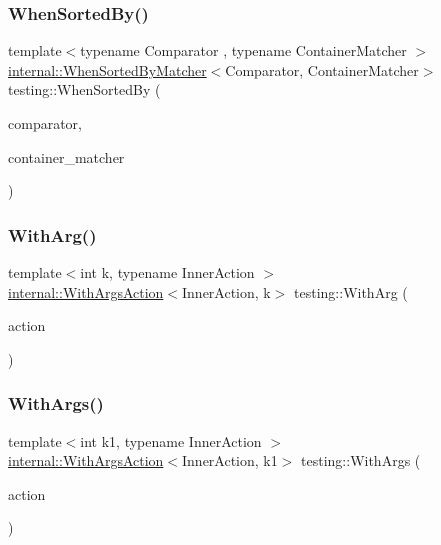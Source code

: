 \mbox{\label{namespacetesting_af74dfcde9ed88d79cf69dfda049078a3}} 
\subsubsection{\texorpdfstring{When\+Sorted\+By()}{WhenSortedBy()}}
{\footnotesize\ttfamily template$<$typename Comparator , typename Container\+Matcher $>$ \\
\hyperlink{classtesting_1_1internal_1_1_when_sorted_by_matcher}{internal\+::\+When\+Sorted\+By\+Matcher}$<$Comparator, Container\+Matcher$>$ testing\+::\+When\+Sorted\+By (\begin{DoxyParamCaption}\item[{const Comparator \&}]{comparator,  }\item[{const Container\+Matcher \&}]{container\+\_\+matcher }\end{DoxyParamCaption})\hspace{0.3cm}{\ttfamily [inline]}}

\mbox{\label{namespacetesting_af76590c6cecc621e1ab4b681a9ea209b}} 
\subsubsection{\texorpdfstring{With\+Arg()}{WithArg()}}
{\footnotesize\ttfamily template$<$int k, typename Inner\+Action $>$ \\
\hyperlink{classtesting_1_1internal_1_1_with_args_action}{internal\+::\+With\+Args\+Action}$<$Inner\+Action, k$>$ testing\+::\+With\+Arg (\begin{DoxyParamCaption}\item[{const Inner\+Action \&}]{action }\end{DoxyParamCaption})\hspace{0.3cm}{\ttfamily [inline]}}

\mbox{\label{namespacetesting_a3bd9eef13bee9065b19d3cd571829c7c}} 
\subsubsection{\texorpdfstring{With\+Args()}{WithArgs()}\hspace{0.1cm}{\footnotesize\ttfamily [1/10]}}
{\footnotesize\ttfamily template$<$int k1, typename Inner\+Action $>$ \\
\hyperlink{classtesting_1_1internal_1_1_with_args_action}{internal\+::\+With\+Args\+Action}$<$Inner\+Action, k1$>$ testing\+::\+With\+Args (\begin{DoxyParamCaption}\item[{const Inner\+Action \&}]{action }\end{DoxyParamCaption})\hspace{0.3cm}{\ttfamily [inline]}}

